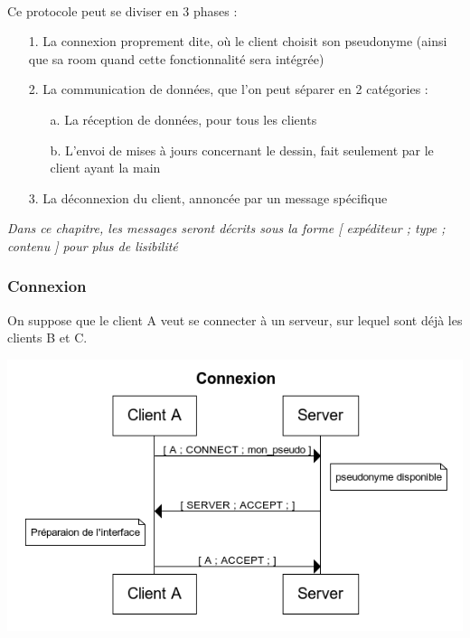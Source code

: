 \documentclass[a4paper,11pt]{article}
\begin{document}
\paragraph{}Ce protocole peut se diviser en 3 phases : 
\begin{itemize}
	\item[1.] La connexion proprement dite, où le client choisit son pseudonyme (ainsi que sa room quand cette fonctionnalité sera intégrée)
	\item[2.] La communication de données, que l'on peut séparer en 2 catégories :
	\begin{itemize}
		\item[a.] La réception de données, pour tous les clients
		\item[b.] L'envoi de mises à jours concernant le dessin, fait seulement par le client ayant la main
	\end{itemize}
	\item[3.] La déconnexion du client, annoncée par un message spécifique
\end{itemize}

\textit{Dans ce chapitre, les messages seront décrits sous la forme [ expéditeur ; type ; contenu ] pour plus de lisibilité}

\subsubsection{Connexion}
On suppose que le client A veut se connecter à un serveur, sur lequel sont déjà les clients B et C.

\begin{center}
\includegraphics[scale=0.8]{image/Connexion.png}
\end{center}
\end{document}
